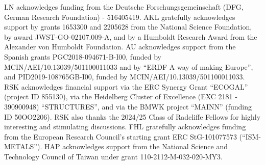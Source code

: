 \documentclass[letter, longauth]{aa} %
\begin{document}
\begin{acknowledgements}
LN acknowledges funding from the Deutsche Forschungsgemeinschaft (DFG, German Research Foundation) - 516405419.
AKL gratefully acknowledges support by grants 1653300 and 2205628 from the National Science Foundation, by award JWST-GO-02107.009-A, and by a Humboldt Research Award from the Alexander von Humboldt Foundation.
AU acknowledges support from the Spanish grants PGC2018-094671-B-I00, funded by MCIN/AEI/10.13039/501100011033 and by ``ERDF A way of making Europe'', and PID2019-108765GB-I00, funded by MCIN/AEI/10.13039/501100011033.
RSK acknowledges financial support via the ERC Synergy Grant ``ECOGAL'' (project ID 855130), via the Heidelberg Cluster of Excellence (EXC 2181 - 390900948) ``STRUCTURES'', and via the BMWK project ``MAINN'' (funding ID 50OO2206). RSK also thanks the 2024/25 Class of Radcliffe Fellows for highly interesting and stimulating discussions.
FHL gratefully acknowledges funding from the European Research Council’s starting grant ERC StG-101077573 (“ISM-METALS”).
HAP acknowledges support from the National Science and Technology Council of Taiwan under grant 110-2112-M-032-020-MY3.


\end{acknowledgements}
\end{document}
